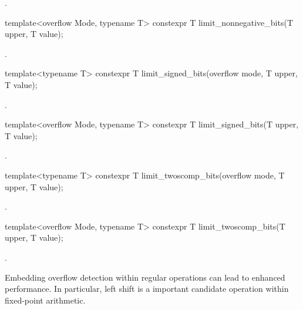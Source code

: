 \begin{addedblock}
\begin{itemdescr}
\returns {}.
\end{itemdescr}

\begin{itemdecl}
template<overflow Mode, typename T>
constexpr T limit_nonnegative_bits(T upper, T value);
\end{itemdecl}

\begin{itemdescr}
\returns {}.
\end{itemdescr}

\begin{itemdecl}
template<typename T>
constexpr T limit_signed_bits(overflow mode, T upper, T value);
\end{itemdecl}

\begin{itemdescr}
\returns {}.
\end{itemdescr}

\begin{itemdecl}
template<overflow Mode, typename T>
constexpr T limit_signed_bits(T upper, T value);
\end{itemdecl}

\begin{itemdescr}
\returns {}.
\end{itemdescr}

\begin{itemdecl}
template<typename T>
constexpr T limit_twoscomp_bits(overflow mode, T upper, T value);
\end{itemdecl}

\begin{itemdescr}
\returns {}.
\end{itemdescr}

\begin{itemdecl}
template<overflow Mode, typename T>
constexpr T limit_twoscomp_bits(T upper, T value);
\end{itemdecl}

\begin{itemdescr}
\returns {}.
\end{itemdescr}

Embedding overflow detection within regular operations can lead to enhanced performance. In particular, left shift is a important candidate operation within fixed-point arithmetic.


\end{addedblock}
